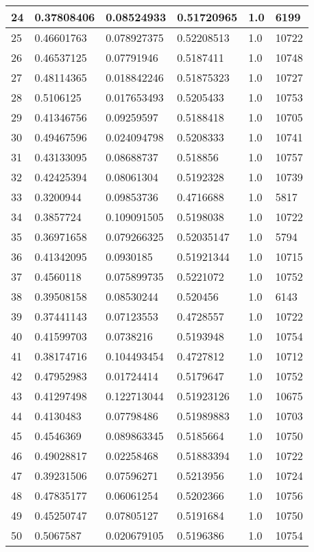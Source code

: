 \begin{longtable}{|l|l|l|l|l|l|}
24 & 0.37808406 & 0.08524933 & 0.51720965 & 1.0 & 6199 \\ \hline 
25 & 0.46601763 & 0.078927375 & 0.52208513 & 1.0 & 10722 \\ \hline 
26 & 0.46537125 & 0.07791946 & 0.5187411 & 1.0 & 10748 \\ \hline 
27 & 0.48114365 & 0.018842246 & 0.51875323 & 1.0 & 10727 \\ \hline 
28 & 0.5106125 & 0.017653493 & 0.5205433 & 1.0 & 10753 \\ \hline 
29 & 0.41346756 & 0.09259597 & 0.5188418 & 1.0 & 10705 \\ \hline 
30 & 0.49467596 & 0.024094798 & 0.5208333 & 1.0 & 10741 \\ \hline 
31 & 0.43133095 & 0.08688737 & 0.518856 & 1.0 & 10757 \\ \hline 
32 & 0.42425394 & 0.08061304 & 0.5192328 & 1.0 & 10739 \\ \hline 
33 & 0.3200944 & 0.09853736 & 0.4716688 & 1.0 & 5817 \\ \hline 
34 & 0.3857724 & 0.109091505 & 0.5198038 & 1.0 & 10722 \\ \hline 
35 & 0.36971658 & 0.079266325 & 0.52035147 & 1.0 & 5794 \\ \hline 
36 & 0.41342095 & 0.0930185 & 0.51921344 & 1.0 & 10715 \\ \hline 
37 & 0.4560118 & 0.075899735 & 0.5221072 & 1.0 & 10752 \\ \hline 
38 & 0.39508158 & 0.08530244 & 0.520456 & 1.0 & 6143 \\ \hline 
39 & 0.37441143 & 0.07123553 & 0.4728557 & 1.0 & 10722 \\ \hline 
40 & 0.41599703 & 0.0738216 & 0.5193948 & 1.0 & 10754 \\ \hline 
41 & 0.38174716 & 0.104493454 & 0.4727812 & 1.0 & 10712 \\ \hline 
42 & 0.47952983 & 0.01724414 & 0.5179647 & 1.0 & 10752 \\ \hline 
43 & 0.41297498 & 0.122713044 & 0.51923126 & 1.0 & 10675 \\ \hline 
44 & 0.4130483 & 0.07798486 & 0.51989883 & 1.0 & 10703 \\ \hline 
45 & 0.4546369 & 0.089863345 & 0.5185664 & 1.0 & 10750 \\ \hline 
46 & 0.49028817 & 0.02258468 & 0.51883394 & 1.0 & 10722 \\ \hline 
47 & 0.39231506 & 0.07596271 & 0.5213956 & 1.0 & 10724 \\ \hline 
48 & 0.47835177 & 0.06061254 & 0.5202366 & 1.0 & 10756 \\ \hline 
49 & 0.45250747 & 0.07805127 & 0.5191684 & 1.0 & 10750 \\ \hline 
50 & 0.5067587 & 0.020679105 & 0.5196386 & 1.0 & 10754 \\ \hline 
\end{longtable}
